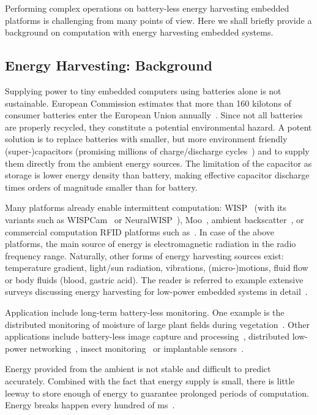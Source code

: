 Performing complex operations on battery-less energy harvesting embedded platforms is challenging from many points of view. Here we shall briefly provide a background on computation with energy harvesting embedded systems. 

\subsection{Energy Harvesting: Background}

Supplying power to tiny embedded computers using batteries alone is not sustainable. European Commission estimates that more than 160 kilotons of consumer batteries enter the European Union annually~\cite{eu_batteries_2016}. Since not all batteries are properly recycled, they constitute a potential environmental hazard. A potent solution is to replace batteries with smaller, but more environment friendly (super-)capacitors (promising millions of charge/discharge cycles~\cite[Sec. I]{ongaro_pwre_2012}) and to supply them directly from the ambient energy sources. The limitation of the capacitor as storage is lower energy density than battery, making effective capacitor discharge times orders of magnitude smaller than for battery.

Many platforms already enable intermittent computation: WISP~\cite{wisp5} (with its variants such as WISPCam~\cite{naderiparizi_rfid_2015} or NeuralWISP~\cite{holleman_biocas_2008}), Moo~\cite{moo}, ambient backscatter~\cite{liu_sigcomm_2013}, or commercial computation RFID platforms such as~\cite{medusa_farsens_2017}. In case of the above platforms, the main source of energy is electromagnetic radiation in the radio frequency range. Naturally, other forms of energy harvesting sources exist: temperature gradient, light/sun radiation, vibrations, (micro-)motions, fluid flow or body fluids (blood, gastric acid). The reader is referred to example extensive surveys discussing energy harvesting for low-power embedded systems in detail~\cite{paradiso_pvc_2005,soyata_csm_2016,prasad_comst_2014,ku_cst_2016}.

Application include long-term battery-less monitoring. One example is the distributed monitoring of moisture of large plant fields during vegetation~\cite{}. Other applications include battery-less image capture and processing~\cite{naderiparizi_rfid_2015}, distributed low-power networking~\cite{}, insect monitoring~\cite{thomas_jbcs_2012} or implantable sensors~\cite{rodriguez_tbcs_2015}.

Energy provided from the ambient is not stable and difficult to predict accurately. Combined with the fact that energy supply is small, there is little leeway to store enough of energy to guarantee prolonged periods of computation. Energy breaks happen every hundred of ms~\cite{soyata_csm_2016,}.

